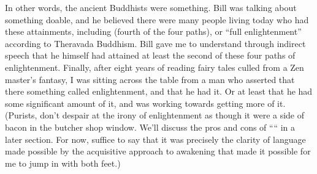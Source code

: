 \documentclass[a5paper,10pt,english]{book}
\begin{document}
\sphinxAtStartPar
In other words, the ancient Buddhists were  something. Bill was
talking about something do\sphinxhyphen{}able, and he believed there were many people
living today who had these attainments, including  (fourth
of the four paths), or “full enlightenment” according to Theravada
Buddhism. Bill gave me to understand through indirect speech that he
himself had attained at least the second of these four paths of
enlightenment. Finally, after eight years of reading fairy tales culled
from a Zen master’s fantasy, I was sitting across the table from a man
who asserted that there  something called enlightenment, and that
he had it. Or at least that he had some significant amount of it, and
was working towards getting more of it. (Purists, don’t despair at the
irony of  enlightenment as though it were a side of bacon in
the butcher shop window. We’ll discuss the pros and cons of
““
in a later section. For now, suffice to say that it was precisely the
clarity of language made possible by the acquisitive approach to
awakening that made it possible for me to jump in with both feet.)
\end{document}
